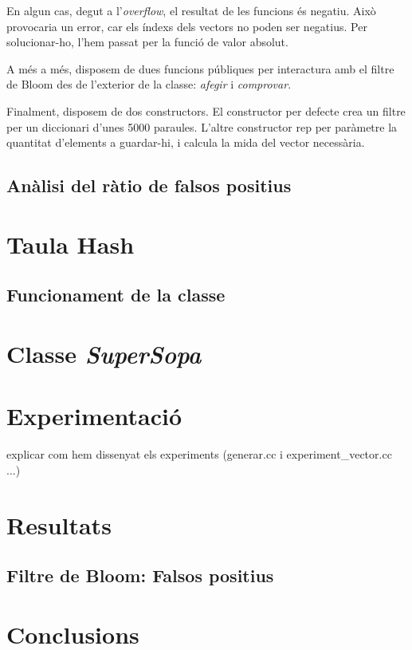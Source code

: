 \documentclass[titlepage]{article}
\begin{document}
En algun cas, degut a l'\textit{overflow}, el resultat de les funcions és negatiu. Això provocaria un error, car els índexs dels vectors no poden ser negatius. Per solucionar-ho, l'hem passat per la funció de valor absolut.

A més a més, disposem de dues funcions públiques per interactura amb el filtre de Bloom des de l'exterior de la classe: \textit{afegir} i \textit{comprovar}. 

Finalment, disposem de dos constructors. El constructor per defecte crea un filtre per un diccionari d'unes 5000 paraules. L'altre constructor rep per paràmetre la quantitat d'elements a guardar-hi, i calcula la mida del vector necessària. 
\subsection{Anàlisi del ràtio de falsos positius}

\clearpage
\section{Taula Hash}
\subsection{Funcionament de la classe}

\clearpage
\section{Classe \textit{SuperSopa}}

\clearpage
\section{Experimentació}
explicar com hem dissenyat els experiments (generar.cc i experiment\_vector.cc ...)

\clearpage
\section{Resultats}
\subsection{Filtre de Bloom: Falsos positius}

\clearpage
\section{Conclusions}
\end{document}

